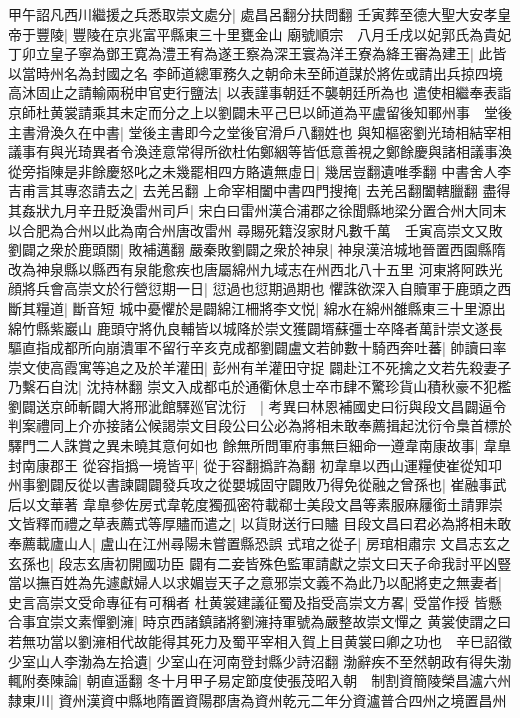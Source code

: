 甲午詔凡西川繼援之兵悉取崇文處分|{
	處昌呂翻分扶問翻}
壬寅葬至德大聖大安孝皇帝于豐陵|{
	豐陵在京兆富平縣東三十里甕金山}
廟號順宗　八月壬戌以妃郭氏為貴妃　丁卯立皇子寧為鄧王寛為澧王宥為遂王察為深王寰為洋王寮為絳王審為建王|{
	此皆以當時州名為封國之名}
李師道總軍務久之朝命未至師道謀於將佐或請出兵掠四境高沐固止之請輸兩税申官吏行鹽法|{
	以表謹事朝廷不襲朝廷所為也}
遣使相繼奉表詣京師杜黄裳請乘其未定而分之上以劉闢未平己巳以師道為平盧留後知鄆州事　堂後主書滑渙久在中書|{
	堂後主書即今之堂後官滑戶八翻姓也}
與知樞密劉光琦相結宰相議事有與光琦異者令渙逹意常得所欲杜佑鄭絪等皆低意善視之鄭餘慶與諸相議事渙從旁指陳是非餘慶怒叱之未幾罷相四方賂遺無虛日|{
	幾居豈翻遺唯季翻}
中書舍人李吉甫言其專恣請去之|{
	去羌呂翻}
上命宰相闔中書四門搜掩|{
	去羌呂翻闔轄臘翻}
盡得其姦狀九月辛丑貶渙雷州司戶|{
	宋白曰雷州漢合浦郡之徐聞縣地梁分置合州大同末以合肥為合州以此為南合州唐改雷州}
尋賜死籍沒家財凡數千萬　壬寅高崇文又敗劉闢之衆於鹿頭關|{
	敗補邁翻}
嚴秦敗劉闢之衆於神泉|{
	神泉漢涪城地晉置西園縣隋改為神泉縣以縣西有泉能愈疾也唐屬綿州九域志在州西北八十五里}
河東將阿跌光顔將兵會高崇文於行營愆期一日|{
	愆過也愆期過期也}
懼誅欲深入自贖軍于鹿頭之西斷其糧道|{
	斷音短}
城中憂懼於是闢綿江柵將李文悦|{
	綿水在綿州雒縣東三十里源出綿竹縣紫巖山}
鹿頭守將仇良輔皆以城降於崇文獲闢壻蘇彊士卒降者萬計崇文遂長驅直指成都所向崩潰軍不留行辛亥克成都劉闢盧文若帥數十騎西奔吐蕃|{
	帥讀曰率}
崇文使高霞寓等追之及於羊灌田|{
	彭州有羊灌田守捉}
闢赴江不死擒之文若先殺妻子乃繫石自沈|{
	沈持林翻}
崇文入成都屯於通衢休息士卒市肆不驚珍貨山積秋豪不犯檻劉闢送京師斬闢大將邢泚館驛廵官沈衍　|{
	考異曰林恩補國史曰衍與段文昌闢逼令判案禮同上介亦接諸公候謁崇文目段公曰公必為將相未敢奉薦揖起沈衍令梟首標於驛門二人誅賞之異未曉其意何如也}
餘無所問軍府事無巨細命一遵韋南康故事|{
	韋臯封南康郡王}
從容指撝一境皆平|{
	從于容翻撝許為翻}
初韋臯以西山運糧使崔從知卭州事劉闢反從以書諫闢闢發兵攻之從嬰城固守闢敗乃得免從融之曾孫也|{
	崔融事武后以文華著}
韋臯參佐房式韋乾度獨孤密符載郗士美段文昌等素服麻屨銜土請罪崇文皆釋而禮之草表薦式等厚贐而遣之|{
	以貨財送行曰贐}
目段文昌曰君必為將相未敢奉薦載廬山人|{
	盧山在江州尋陽未嘗置縣恐誤}
式琯之從子|{
	房琯相肅宗}
文昌志玄之玄孫也|{
	段志玄唐初開國功臣}
闢有二妾皆殊色監軍請獻之崇文曰天子命我討平凶豎當以撫百姓為先遽獻婦人以求媚豈天子之意邪崇文義不為此乃以配將吏之無妻者|{
	史言高崇文受命專征有可稱者}
杜黄裳建議征蜀及指受高崇文方畧|{
	受當作授}
皆懸合事宜崇文素憚劉澭|{
	時京西諸鎮諸將劉澭持軍號為嚴整故崇文憚之}
黄裳使謂之曰若無功當以劉澭相代故能得其死力及蜀平宰相入賀上目黄裳曰卿之功也　辛巳詔徵少室山人李渤為左拾遺|{
	少室山在河南登封縣少詩沼翻}
渤辭疾不至然朝政有得失渤輒附奏陳論|{
	朝直遥翻}
冬十月甲子易定節度使張茂昭入朝　制割資簡陵榮昌瀘六州隸東川|{
	資州漢資中縣地隋置資陽郡唐為資州乾元二年分資瀘普合四州之境置昌州}
